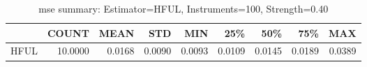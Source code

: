 \begin{table}[ht]
\centering
\caption{mse summary: Estimator=HFUL, Instruments=100, Strength=0.40}
\begin{tabular}{lrrrrrrrr}
\toprule
 & COUNT & MEAN & STD & MIN & 25\% & 50\% & 75\% & MAX \\
\midrule
HFUL & 10.0000 & 0.0168 & 0.0090 & 0.0093 & 0.0109 & 0.0145 & 0.0189 & 0.0389 \\
\bottomrule
\end{tabular}
\end{table}
